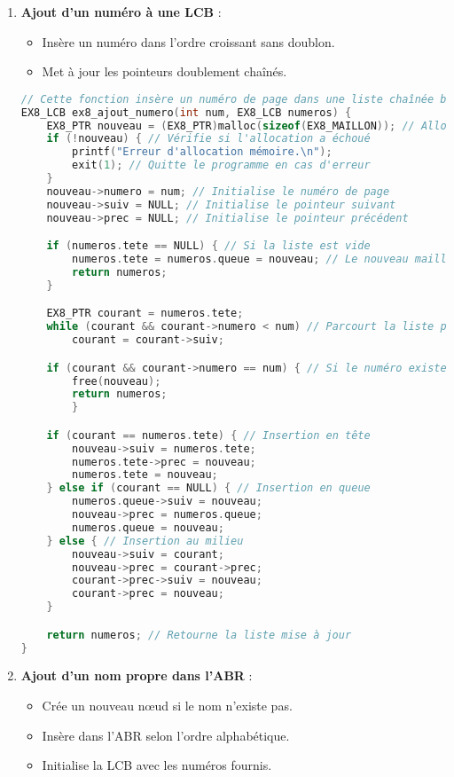 \documentclass[a4paper,12pt]{article}
\begin{document}
\begin{enumerate}
    \item \textbf{Ajout d'un numéro à une LCB} :
    \begin{itemize}
        \item Insère un numéro dans l'ordre croissant sans doublon.
        \item Met à jour les pointeurs doublement chaînés.
    \end{itemize}

\begin{lstlisting}[language=C, caption={Ajout d'un numéro}]
// Cette fonction insère un numéro de page dans une liste chaînée bidirectionnelle triée.
EX8_LCB ex8_ajout_numero(int num, EX8_LCB numeros) {
    EX8_PTR nouveau = (EX8_PTR)malloc(sizeof(EX8_MAILLON)); // Alloue un nouveau maillon
    if (!nouveau) { // Vérifie si l'allocation a échoué
        printf("Erreur d'allocation mémoire.\n");
        exit(1); // Quitte le programme en cas d'erreur
    }
    nouveau->numero = num; // Initialise le numéro de page
    nouveau->suiv = NULL; // Initialise le pointeur suivant
    nouveau->prec = NULL; // Initialise le pointeur précédent

    if (numeros.tete == NULL) { // Si la liste est vide
        numeros.tete = numeros.queue = nouveau; // Le nouveau maillon devient la tête et la queue
        return numeros;
    }

    EX8_PTR courant = numeros.tete;
    while (courant && courant->numero < num) // Parcourt la liste pour trouver la position d'insertion
        courant = courant->suiv;

    if (courant && courant->numero == num) { // Si le numéro existe déjà, ne rien faire
        free(nouveau);
        return numeros;
        }

    if (courant == numeros.tete) { // Insertion en tête
        nouveau->suiv = numeros.tete;
        numeros.tete->prec = nouveau;
        numeros.tete = nouveau;
    } else if (courant == NULL) { // Insertion en queue
        numeros.queue->suiv = nouveau;
        nouveau->prec = numeros.queue;
        numeros.queue = nouveau;
    } else { // Insertion au milieu
        nouveau->suiv = courant;
        nouveau->prec = courant->prec;
        courant->prec->suiv = nouveau;
        courant->prec = nouveau;
    }

    return numeros; // Retourne la liste mise à jour
}
\end{lstlisting}

    \item \textbf{Ajout d'un nom propre dans l'ABR} :
    \begin{itemize}
        \item Crée un nouveau nœud si le nom n'existe pas.
        \item Insère dans l'ABR selon l'ordre alphabétique.
        \item Initialise la LCB avec les numéros fournis.
    \end{itemize}


\end{enumerate}
\end{document}
